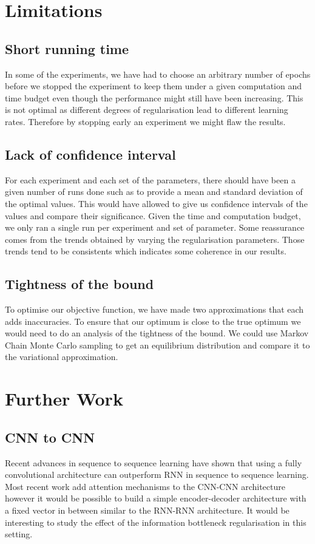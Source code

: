 \documentclass[11pt,oneside,openright]{report}
\begin{document}
\section{Limitations}
\subsection{Short running time}
In some of the experiments, we have had to choose an arbitrary number of epochs before we stopped the experiment to keep them under a given computation and time budget even though the performance might still have been increasing. This is not optimal as different degrees of regularisation lead to different learning rates. Therefore by stopping early an experiment we might flaw the results.

\subsection{Lack of confidence interval}
For each experiment and each set of the parameters, there should have been a given number of runs done such as to provide a mean and standard deviation of the optimal values. This would have allowed to give us confidence intervals of the values and compare their significance. Given the time and computation budget, we only ran a single run per experiment and set of parameter. Some reassurance comes from the trends obtained by varying the regularisation parameters. Those trends tend to be consistents which indicates some coherence in our results. 

\subsection{Tightness of the bound}
To optimise our objective function, we have made two approximations that each adds inaccuracies. To ensure that our optimum is close to the true optimum we would need to do an analysis of the tightness of the bound. We could use Markov Chain Monte Carlo sampling to get an equilibrium distribution and compare it to the variational approximation.

\section{Further Work}
\subsection{CNN to CNN}
Recent advances in sequence to sequence learning \cite{cnn_s2s} have shown that using a fully convolutional architecture can outperform RNN in sequence to sequence learning. Most recent work add attention mechanisms to the CNN-CNN architecture however it would be possible to build a simple encoder-decoder architecture with a fixed vector in between similar to the RNN-RNN architecture. It would be interesting to study the effect of the information bottleneck regularisation in this setting.
\end{document}
